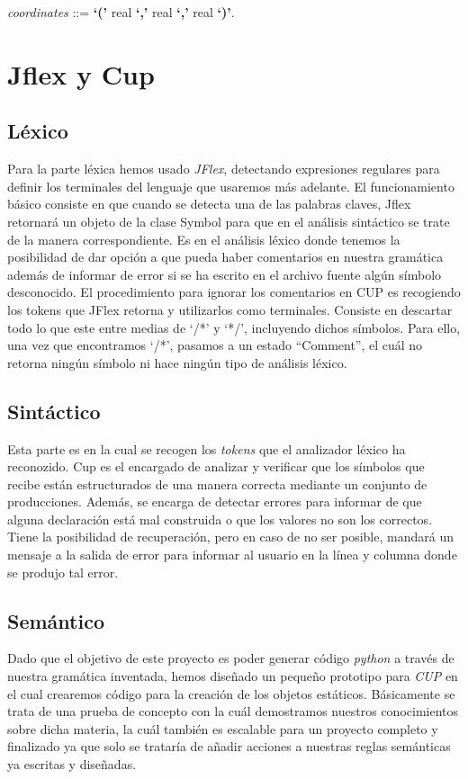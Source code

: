 \documentclass[12pt]{article}
\begin{document}
\noindent \textit{coordinates} ::= \textbf{`('} real \textbf{`,'} real \textbf{`,'} real \textbf{`)'}.

\section{Jflex y Cup}

\subsection{Léxico}

Para la parte léxica hemos usado \textit{JFlex}, detectando expresiones regulares para definir los terminales del lenguaje que usaremos más adelante.
El funcionamiento básico consiste en que cuando se detecta una de las palabras claves, Jflex retornará un objeto de la clase Symbol para que en el análisis sintáctico se trate de la manera correspondiente.
Es en el análisis léxico donde tenemos la posibilidad de dar opción a que pueda haber comentarios en nuestra gramática además de informar de error si se ha escrito en el archivo fuente algún símbolo desconocido. El procedimiento para ignorar los comentarios en CUP es recogiendo los tokens que JFlex retorna y utilizarlos como terminales. Consiste en descartar todo lo que este entre medias de `/*' y `*/', incluyendo dichos símbolos. Para ello, una vez que encontramos `/*', pasamos a un estado ``Comment'', el cuál no retorna ningún símbolo ni hace ningún tipo de análisis léxico.

\subsection{Sintáctico}

Esta parte es en la cual se recogen los \textit{tokens} que el analizador léxico ha reconozido. Cup es el encargado de analizar y verificar que los símbolos que recibe están estructurados de una manera correcta mediante un conjunto de producciones. Además, se encarga de detectar errores para informar de que alguna declaración está mal construida o que los valores no son los correctos. Tiene
la posibilidad de recuperación, pero en caso de no ser posible, mandará un mensaje a la salida de error para informar al usuario en la
línea y columna donde se produjo tal error.

\subsection{Semántico}

Dado que el objetivo de este proyecto es poder generar código \textit{python} a través de nuestra gramática inventada, hemos diseñado un pequeño prototipo para \textit{CUP} en el cual crearemos código para la creación de los objetos estáticos. Básicamente se trata de una prueba de concepto con la cuál demostramos nuestros conocimientos sobre dicha materia, la cuál también es escalable para un proyecto completo y finalizado ya que solo se trataría de añadir acciones a nuestras reglas semánticas ya escritas y diseñadas.

\newpage


\end{document}
